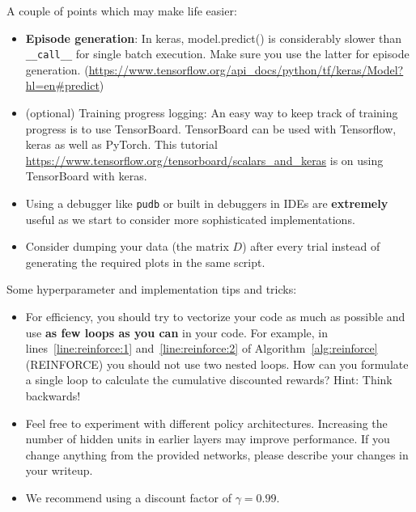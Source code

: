 \documentclass[12pt]{article}
\begin{document}
A couple of points which may make life easier:
\begin{itemize}
    \item \textbf{Episode generation}: In keras, model.predict() is considerably slower than \texttt{\_\_call\_\_} for single batch execution. Make sure you use the latter for episode generation. (\url{https://www.tensorflow.org/api\_docs/python/tf/keras/Model?hl=en\#predict})
    \item (optional) Training progress logging: An easy way to keep track of training progress is to use TensorBoard. TensorBoard can be used with Tensorflow, keras as well as PyTorch. This tutorial \url{https://www.tensorflow.org/tensorboard/scalars_and_keras} is on using TensorBoard with keras.
    \item Using a debugger like \texttt{pudb} or built in debuggers in IDEs are \textbf{extremely} useful as we start to consider more sophisticated implementations.
    \item Consider dumping your data (the matrix $D$) after every trial instead of generating the required plots in the same script.
\end{itemize}

Some hyperparameter and implementation tips and tricks:
\begin{itemize}
    \item For efficiency, you should try to vectorize your code as much as possible and use \textbf{as few loops as you can} in your code. For example, in lines~\ref{line:reinforce:1} and~\ref{line:reinforce:2} of Algorithm~\ref{alg:reinforce} (REINFORCE) you should not use two nested loops. How can you formulate a single loop to calculate the cumulative discounted rewards? Hint: Think backwards!
    \item Feel free to experiment with different policy architectures. Increasing the number of hidden units in earlier layers may improve performance. If you change anything from the provided networks, please describe your changes in your writeup.
    \item We recommend using a discount factor of $\gamma = 0.99$.
\end{itemize}
\end{document}
